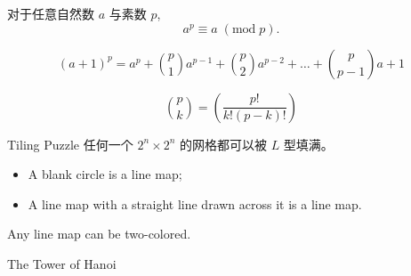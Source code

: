 
\begin{frame}{}
  \begin{theorem}
    对于任意自然数 $a$ 与素数 $p$,
    \[
      a^{p} \equiv a \;(\mathrm{mod}\; p).
    \]
  \end{theorem}

  \pause
  \[
    (a+1)^p = a^p+ \binom{p}{1} a^{p-1} + \binom{p}{2} a^{p-2}
      + \dots + \binom{p}{p-1}a + 1
  \]

  \pause
  \[
    \binom{p}{k} = \left( \frac{p!}{k!(p-k)!} \right)
  \]
\end{frame}

\begin{frame}{}
  \begin{exampleblock}{Tiling Puzzle}
    任何一个 $2^{n} \times 2^{n}$ 的网格都可以被 $L$ 型填满。
  \end{exampleblock}

\end{frame}

\begin{frame}{}
  \begin{definition}
    \begin{itemize}
      \item A blank circle is a line map;
      \item A line map with a straight line drawn across it is a line map.
    \end{itemize}
  \end{definition}


  \pause
  \vspace{-0.50cm}
  \begin{theorem}
    Any line map can be two-colored.
  \end{theorem}
\end{frame}

\begin{frame}{}
  \begin{exampleblock}{The Tower of Hanoi}
  \end{exampleblock}
\end{frame}

